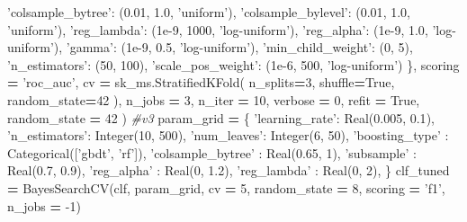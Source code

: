 \documentclass[]{book}
\newenvironment{Shaded}{\begin{snugshade}}{\end{snugshade}}
\newcommand{\CommentTok}[1]{\textcolor[rgb]{0.56,0.35,0.01}{\textit{#1}}}
\newcommand{\DecValTok}[1]{\textcolor[rgb]{0.00,0.00,0.81}{#1}}
\newcommand{\FloatTok}[1]{\textcolor[rgb]{0.00,0.00,0.81}{#1}}
\newcommand{\NormalTok}[1]{#1}
\newcommand{\OperatorTok}[1]{\textcolor[rgb]{0.81,0.36,0.00}{\textbf{#1}}}
\newcommand{\StringTok}[1]{\textcolor[rgb]{0.31,0.60,0.02}{#1}}
\newcommand{\VariableTok}[1]{\textcolor[rgb]{0.00,0.00,0.00}{#1}}
\begin{document}
\begin{Shaded}
\begin{Highlighting}[]
        \StringTok{'colsample_bytree'}\NormalTok{: (}\FloatTok{0.01}\NormalTok{, }\FloatTok{1.0}\NormalTok{, }\StringTok{'uniform'}\NormalTok{),}
        \StringTok{'colsample_bylevel'}\NormalTok{: (}\FloatTok{0.01}\NormalTok{, }\FloatTok{1.0}\NormalTok{, }\StringTok{'uniform'}\NormalTok{),}
        \StringTok{'reg_lambda'}\NormalTok{: (}\FloatTok{1e-9}\NormalTok{, }\DecValTok{1000}\NormalTok{, }\StringTok{'log-uniform'}\NormalTok{),}
        \StringTok{'reg_alpha'}\NormalTok{: (}\FloatTok{1e-9}\NormalTok{, }\FloatTok{1.0}\NormalTok{, }\StringTok{'log-uniform'}\NormalTok{),}
        \StringTok{'gamma'}\NormalTok{: (}\FloatTok{1e-9}\NormalTok{, }\FloatTok{0.5}\NormalTok{, }\StringTok{'log-uniform'}\NormalTok{),}
        \StringTok{'min_child_weight'}\NormalTok{: (}\DecValTok{0}\NormalTok{, }\DecValTok{5}\NormalTok{),}
        \StringTok{'n_estimators'}\NormalTok{: (}\DecValTok{50}\NormalTok{, }\DecValTok{100}\NormalTok{),}
        \StringTok{'scale_pos_weight'}\NormalTok{: (}\FloatTok{1e-6}\NormalTok{, }\DecValTok{500}\NormalTok{, }\StringTok{'log-uniform'}\NormalTok{)}
\NormalTok{    \},    }
\NormalTok{    scoring }\OperatorTok{=} \StringTok{'roc_auc'}\NormalTok{,}
\NormalTok{    cv }\OperatorTok{=}\NormalTok{ sk_ms.StratifiedKFold(}
\NormalTok{        n_splits}\OperatorTok{=}\DecValTok{3}\NormalTok{,}
\NormalTok{        shuffle}\OperatorTok{=}\VariableTok{True}\NormalTok{,}
\NormalTok{        random_state}\OperatorTok{=}\DecValTok{42}
\NormalTok{    ),}
\NormalTok{    n_jobs }\OperatorTok{=} \DecValTok{3}\NormalTok{,}
\NormalTok{    n_iter }\OperatorTok{=} \DecValTok{10}\NormalTok{,   }
\NormalTok{    verbose }\OperatorTok{=} \DecValTok{0}\NormalTok{,}
\NormalTok{    refit }\OperatorTok{=} \VariableTok{True}\NormalTok{,}
\NormalTok{    random_state }\OperatorTok{=} \DecValTok{42}
\NormalTok{)}
\CommentTok{#v3}
\NormalTok{param_grid }\OperatorTok{=}\NormalTok{ \{}
    \StringTok{'learning_rate'}\NormalTok{: Real(}\FloatTok{0.005}\NormalTok{, }\FloatTok{0.1}\NormalTok{), }\StringTok{'n_estimators'}\NormalTok{: Integer(}\DecValTok{10}\NormalTok{, }\DecValTok{500}\NormalTok{),}
    \StringTok{'num_leaves'}\NormalTok{: Integer(}\DecValTok{6}\NormalTok{, }\DecValTok{50}\NormalTok{), }\StringTok{'boosting_type'}\NormalTok{ : Categorical([}\StringTok{'gbdt'}\NormalTok{, }\StringTok{'rf'}\NormalTok{]),}
    \StringTok{'colsample_bytree'}\NormalTok{ : Real(}\FloatTok{0.65}\NormalTok{, }\DecValTok{1}\NormalTok{), }\StringTok{'subsample'}\NormalTok{ : Real(}\FloatTok{0.7}\NormalTok{, }\FloatTok{0.9}\NormalTok{),}
    \StringTok{'reg_alpha'}\NormalTok{ : Real(}\DecValTok{0}\NormalTok{, }\FloatTok{1.2}\NormalTok{), }\StringTok{'reg_lambda'}\NormalTok{ : Real(}\DecValTok{0}\NormalTok{, }\DecValTok{2}\NormalTok{),}
\NormalTok{    \}}
\NormalTok{clf_tuned }\OperatorTok{=}\NormalTok{ BayesSearchCV(clf, param_grid, cv }\OperatorTok{=} \DecValTok{5}\NormalTok{, random_state }\OperatorTok{=} \DecValTok{8}\NormalTok{, scoring }\OperatorTok{=} \StringTok{'f1'}\NormalTok{, n_jobs }\OperatorTok{=} \DecValTok{-1}\NormalTok{)}
\end{Highlighting}
\end{Shaded}
\end{document}
